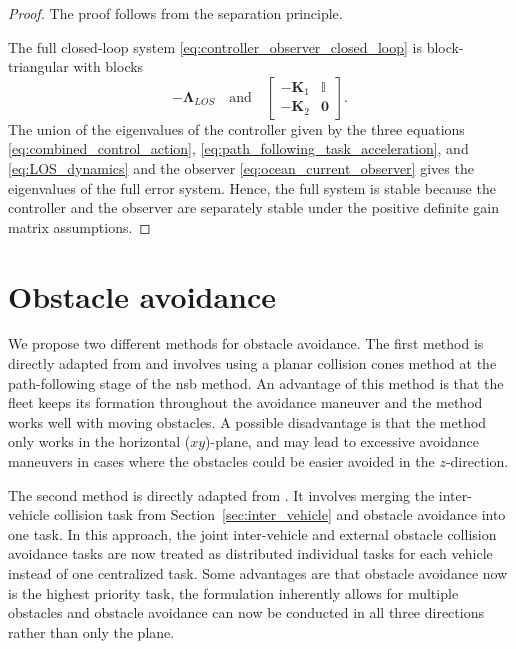 \begin{proof}
    The proof follows from the separation principle. 
    
    The full closed-loop system \eqref{eq:controller_observer_closed_loop} is block-triangular with blocks
\begin{equation*}
    -\mathbf{\Lambda}_{LOS} \quad \mathrm{and} \quad \begin{bmatrix}
        -\mathbf{K}_1 & \mathbb{I}\\-\mathbf{K}_2 & \mathbf{0}
    \end{bmatrix}.
\end{equation*}
The union of the eigenvalues of the controller given by the three equations \eqref{eq:combined_control_action}, \eqref{eq:path_following_task_acceleration}, and \eqref{eq:LOS_dynamics} and the observer \eqref{eq:ocean_current_observer} gives the eigenvalues of the full error system. Hence, the full system is stable because the controller and the observer are separately stable under the positive definite gain matrix assumptions.
\end{proof}


\section{Obstacle avoidance}\label{sec:obstacle_avoidance}
We propose two different methods for obstacle avoidance. The first method is directly adapted from \cite{matous_singularity-free_2022} and involves using a planar collision cones method at the path-following stage of the \gls{nsb} method. An advantage of this method is that the fleet keeps its formation throughout the avoidance maneuver and the method works well with moving obstacles. A possible disadvantage is that the method only works in the horizontal ($xy$)-plane, and may lead to excessive avoidance maneuvers in cases where the obstacles could be easier avoided in the $z$-direction.

The second method is directly adapted from \cite{arrichiello_formation_2006}. It involves merging the inter-vehicle collision task from Section~\ref{sec:inter_vehicle} and obstacle avoidance into one task. In this approach, the joint inter-vehicle and external obstacle collision avoidance tasks are now treated as distributed individual tasks for each vehicle instead of one centralized task.  Some advantages are that obstacle avoidance now is the highest priority task, the formulation inherently allows for multiple obstacles and obstacle avoidance can now be conducted in all three directions rather than only the plane. 


